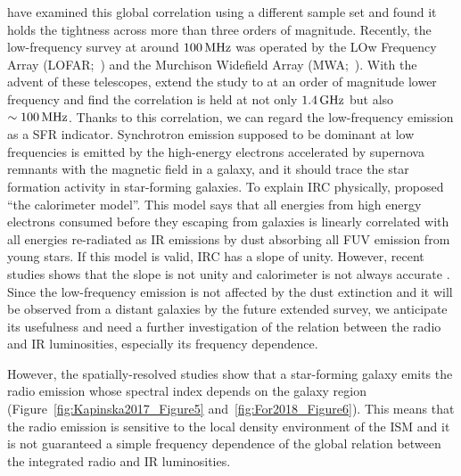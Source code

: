 \citet{Condon1991a,Yun2001a, Bell2003} have examined this global correlation using a different sample set and found it holds the tightness across more than three orders of magnitude.
Recently, the low-frequency survey at around $100\,\mathrm{MHz}$ was operated by the LOw Frequency Array (LOFAR;~\citealt{VanHaarlem2013}) and the Murchison Widefield Array (MWA;~\citealt{Tingay2013a}).
With the advent of these telescopes, \citet{CalistroRivera2017a, Read2018, Wang2019} extend the study to at an order of magnitude lower frequency and find the correlation is held at not only $1.4\,\mathrm{GHz}$ but also $\sim 100\,\mathrm{MHz}$.
Thanks to this correlation, we can regard the low-frequency emission as a SFR indicator.
Synchrotron emission supposed to be dominant at low frequencies is emitted by the high-energy electrons accelerated by supernova remnants with the magnetic field in a galaxy, and it should trace the star formation activity in star-forming galaxies.
To explain IRC physically, \citet{Volk1989} proposed ``the calorimeter model''.
This model says that all energies from high energy electrons consumed before they escaping from galaxies is linearly correlated with all energies re-radiated as IR emissions by dust absorbing all FUV emission from young stars.
If this model is valid, IRC has a slope of unity.
However, recent studies shows that the slope is not unity and calorimeter is not always accurate \citep{CalistroRivera2017a, Read2018}.
Since the low-frequency emission is not affected by the dust extinction \citep{Yun2001a, Murphy2011} and it will be observed from a distant galaxies by the future extended survey, we anticipate its usefulness and need a further investigation of the relation between the radio and IR luminosities, especially its frequency dependence.

However, the spatially-resolved studies show that a star-forming galaxy emits the radio emission whose spectral index depends on the galaxy region \citep{Kapinska2017a, For2018a, Heesen2019} (Figure~\ref{fig:Kapinska2017_Figure5} and~\ref{fig:For2018_Figure6}).
This means that the radio emission is sensitive to the local density environment of the ISM and it is not guaranteed a simple frequency dependence of the global relation between the integrated radio and IR luminosities.

